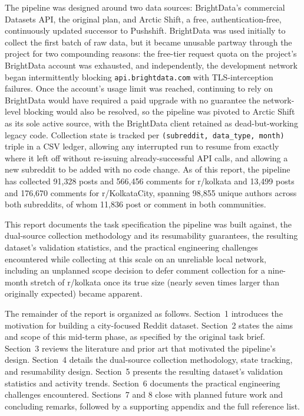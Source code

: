\documentclass[12pt]{article}
\begin{document}
The pipeline was designed around two data sources: BrightData's commercial Datasets API, the
original plan, and Arctic Shift, a free, authentication-free, continuously updated successor to
Pushshift. BrightData was used initially to collect the first batch of raw data, but it became
unusable partway through the project for two compounding reasons: the free-tier request quota
on the project's BrightData account was exhausted, and independently, the development network
began intermittently blocking \texttt{api.brightdata.com} with TLS-interception failures. Once
the account's usage limit was reached, continuing to rely on BrightData would have required a
paid upgrade with no guarantee the network-level blocking would also be resolved, so the pipeline
was pivoted to Arctic Shift as its sole active source, with the BrightData client retained as
dead-but-working legacy code. Collection state is tracked per \texttt{(subreddit, data\_type, month)} triple in a
CSV ledger, allowing any interrupted run to resume from exactly where it left off without
re-issuing already-successful API calls, and allowing a new subreddit to be added with no code
change. As of this report, the pipeline has collected 91,328 posts and 566,456 comments for
r/kolkata and 13,499 posts and 176,670 comments for r/KolkataCity, spanning 98,855 unique
authors across both subreddits, of whom 11,836 post or comment in both communities.

This report documents the task specification the pipeline was built against, the dual-source
collection methodology and its resumability guarantees, the resulting dataset's validation
statistics, and the practical engineering challenges encountered while collecting at this scale
on an unreliable local network, including an unplanned scope decision to defer comment
collection for a nine-month stretch of r/kolkata once its true size (nearly seven times larger
than originally expected) became apparent.

The remainder of the report is organized as follows. Section~1 introduces the motivation for
building a city-focused Reddit dataset. Section~2 states the aims and scope of this mid-term
phase, as specified by the original task brief. Section~3 reviews the literature and prior art
that motivated the pipeline's design. Section~4 details the dual-source collection methodology,
state tracking, and resumability design. Section~5 presents the resulting dataset's validation
statistics and activity trends. Section~6 documents the practical engineering challenges
encountered. Sections~7 and 8 close with planned future work and concluding remarks, followed
by a supporting appendix and the full reference list.
\end{document}
